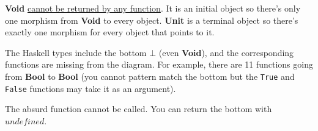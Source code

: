 \documentclass[]{article}
\newcommand{\parx}{\par\noindent}
\begin{document}
\noindent\textbf{Void} \href{https://stackoverflow.com/questions/38553622/inverse-of-the-absurd-function}{cannot be returned by any function}. It is an initial object so there's only one morphism from \textbf{Void} to every object.
\noindent\textbf{Unit} is a terminal object so there's exactly one morphism for every object that points to it.\\ 

\parx The Haskell types include the bottom $\bot$ (even \textbf{Void}), and the corresponding functions are missing from the diagram. For example, there are 11 functions going from \textbf{Bool} to \textbf{Bool} (you cannot pattern match the bottom but the \texttt{True} and \texttt{False} functions may take it as an argument).\\

\parx The absurd function cannot be called. You can return the bottom with $undefined$.
\end{document}
